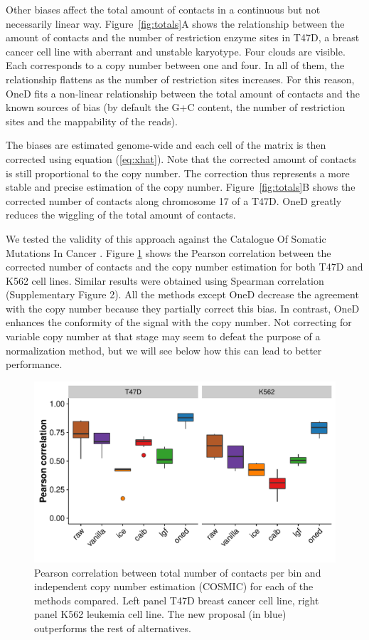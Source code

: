 \documentclass{bioinfo}
\begin{document}
Other biases affect the total amount of contacts in a continuous but not
necessarily linear way. Figure~\ref{fig:totals}A shows the relationship
between the amount of contacts and the number of restriction enzyme sites
in T47D, a breast cancer cell line with aberrant and unstable karyotype.
Four clouds are visible. Each corresponds to a copy number between one and
four. In all of them, the relationship flattens as the number of
restriction sites increases. For this reason, OneD fits a non-linear
relationship between the total amount of contacts and the known sources of
bias (by default the G+C content, the number of restriction sites and the
mappability of the reads).

The biases are estimated genome-wide and each cell of the matrix is then
corrected using equation (\ref{eq:xhat}). Note that the corrected amount
of contacts is still proportional to the copy number. The correction thus
represents a more stable and precise estimation of the copy number.
Figure~\ref{fig:totals}B shows the corrected number of contacts along
chromosome 17 of a T47D. OneD greatly reduces the wiggling of the total
amount of contacts.

We tested the validity of this approach against the Catalogue Of Somatic
Mutations In Cancer \citep[COSMIC,][]{forbes2010cosmic}. Figure
\ref{fig:copy_number} shows the Pearson correlation between the corrected
number of contacts and the copy number estimation for both T47D and K562
cell lines. Similar results were obtained using Spearman correlation
(Supplementary Figure 2). All the methods except OneD decrease the
agreement with the copy number because they partially correct this bias.
In contrast, OneD enhances the conformity of the signal with the copy
number. Not correcting for variable copy number at that stage may seem to
defeat the purpose of a normalization method, but we will see below how
this can lead to better performance.


\begin{figure}
	\centerline{\includegraphics[width=.45\textwidth]
{img/copy_number_figure2.pdf}}
	\caption{
    Pearson correlation between total number of contacts per bin and
independent copy number estimation (COSMIC) for each of the methods
compared. Left panel T47D breast cancer cell line, right panel K562
leukemia cell line. The new proposal (in blue) outperforms the rest of
alternatives.  }\label{fig:copy_number}
\end{figure}
\end{document}
